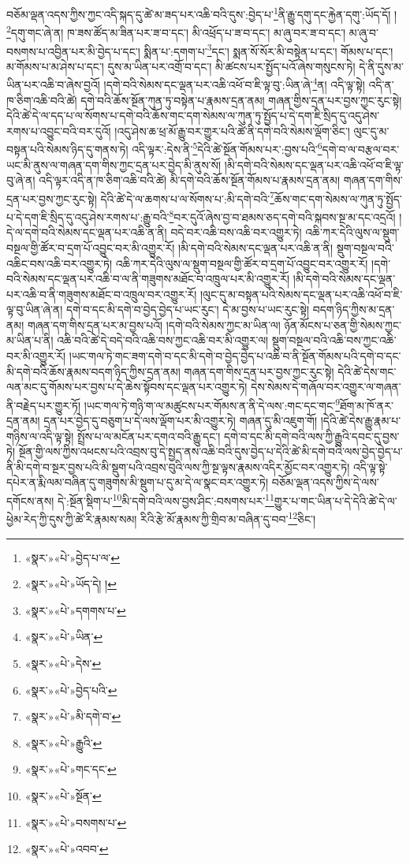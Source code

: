 བཅོམ་ལྡན་འདས་ཀྱིས་ཀྱང་འདི་སྐད་དུ་ཚེ་མ་ཟད་པར་འཆི་བའི་དུས་:བྱེད་པ་\footnote{«སྣར་»«པེ་»བྱེད་པ་ལ་}ནི་རྒྱུ་དགུ་དང་རྐྱེན་དགུ་:ཡོད་དོ། །
\footnote{«སྣར་»«པེ་»ཡོད་དེ། །}དགུ་གང་ཞེ་ན། ཁ་ཟས་ཚོད་མ་ཟིན་པར་ཟ་བ་དང་། མི་འཕྲོད་པ་ཟ་བ་དང་། མ་ཞུ་བར་ཟ་བ་དང་། མ་ཞུ་བ་བསགས་པ་འབྱིན་པར་མི་བྱེད་པ་དང་། སྨིན་པ་:དགག་པ་\footnote{«སྣར་»«པེ་»དགགས་པ་}དང་། སྨན་སོ་སོར་མི་བསྟེན་པ་དང་། གོམས་པ་དང་། མ་གོམས་པ་མ་ཤེས་པ་དང་། དུས་མ་ཡིན་པར་འགྲོ་བ་དང་། མི་ཚངས་པར་སྤྱོད་པའོ་ཞེས་གསུངས་ཏེ། དེ་ནི་དུས་མ་ཡིན་པར་འཆི་བ་ཞེས་བྱའོ། །དགེ་བའི་སེམས་དང་ལྡན་པར་འཆི་འཕོ་བ་ཇི་ལྟ་བུ་:ཡིན་ཞེ་\footnote{«སྣར་»«པེ་»ཡིན་}ན། འདི་ལྟ་སྟེ། འདི་ན་ཁ་ཅིག་འཆི་བའི་ཚེ། དགེ་བའི་ཆོས་སྔོན་ཀུན་ཏུ་བསྟེན་པ་རྣམས་དྲན་ནམ། གཞན་གྱིས་དྲན་པར་བྱས་ཀྱང་རུང་སྟེ། དེའི་ཚེ་དེ་ལ་དད་པ་ལ་སོགས་པ་དགེ་བའི་ཆོས་གང་དག་སེམས་ལ་ཀུན་ཏུ་སྤྱོད་པ་དེ་དག་ཇི་སྲིད་དུ་འདུ་ཤེས་རགས་པ་འབྱུང་བའི་བར་དུའོ། །འདུ་ཤེས་ཆ་ཕྲ་མོ་རྒྱུ་བར་གྱུར་པའི་ཚེ་ནི་དགེ་བའི་སེམས་ལྡོག་ཅིང་། ལུང་དུ་མ་བསྟན་པའི་སེམས་ཉིད་དུ་གནས་ཏེ། འདི་ལྟར་:དེས་ནི་\footnote{«སྣར་»«པེ་»དེས་}དེའི་ཚེ་སྔོན་གོམས་པར་:བྱས་པའི་\footnote{«སྣར་»«པེ་»བྱེད་པའི་}དགེ་བ་ལ་བརྩལ་བར་ཡང་མི་ནུས་ལ་གཞན་དག་གིས་ཀྱང་དྲན་པར་བྱེད་མི་ནུས་སོ། །མི་དགེ་བའི་སེམས་དང་ལྡན་པར་འཆི་འཕོ་བ་ཇི་ལྟ་བུ་ཞེ་ན། འདི་ལྟར་འདི་ན་ཁ་ཅིག་འཆི་བའི་ཚེ། མི་དགེ་བའི་ཆོས་སྔོན་གོམས་པ་རྣམས་དྲན་ནམ། གཞན་དག་གིས་དྲན་པར་བྱས་ཀྱང་རུང་སྟེ། དེའི་ཚེ་དེ་ལ་ཆགས་པ་ལ་སོགས་པ་:མི་དགེ་བའི་\footnote{«སྣར་»«པེ་»མི་དགེ་བ་}ཆོས་གང་དག་སེམས་ལ་ཀུན་ཏུ་སྤྱོད་པ་དེ་དག་ཇི་སྲིད་དུ་འདུ་ཤེས་རགས་པ་:རྒྱུ་བའི་\footnote{«སྣར་»«པེ་»རྒྱུའི་}བར་དུའོ་ཞེས་བྱ་བ་ཐམས་ཅད་དགེ་བའི་སྐབས་སྔ་མ་དང་འདྲའོ། །དེ་ལ་དགེ་བའི་སེམས་དང་ལྡན་པར་འཆི་ན་ནི། བདེ་བར་འཆི་བས་འཆི་བར་འགྱུར་ཏེ། འཆི་ཀར་དེའི་ལུས་ལ་སྡུག་བསྔལ་གྱི་ཚོར་བ་དྲག་པོ་འབྱུང་བར་མི་འགྱུར་རོ། །མི་དགེ་བའི་སེམས་དང་ལྡན་པར་འཆི་ན་ནི། སྡུག་བསྔལ་བའི་འཆིང་བས་འཆི་བར་འགྱུར་ཏེ། འཆི་ཀར་དེའི་ལུས་ལ་སྡུག་བསྔལ་གྱི་ཚོར་བ་དྲག་པོ་འབྱུང་བར་འགྱུར་རོ། །དགེ་བའི་སེམས་དང་ལྡན་པར་འཆི་བ་ལ་ནི་གཟུགས་མཐོང་བ་འཁྲུལ་པར་མི་འགྱུར་རོ། །མི་དགེ་བའི་སེམས་དང་ལྡན་པར་འཆི་བ་ནི་གཟུགས་མཐོང་བ་འཁྲུལ་བར་འགྱུར་རོ། །ལུང་དུ་མ་བསྟན་པའི་སེམས་དང་ལྡན་པར་འཆི་འཕོ་བ་ཇི་ལྟ་བུ་ཡིན་ཞེ་ན། དགེ་བ་དང་མི་དགེ་བ་བྱེད་བྱེད་པ་ཡང་རུང་། དེ་མ་བྱས་པ་ཡང་རུང་སྟེ། བདག་ཉིད་ཀྱིས་མ་དྲན་ནམ། གཞན་དག་གིས་དྲན་པར་མ་བྱས་པའོ། །དགེ་བའི་སེམས་ཀྱང་མ་ཡིན་ལ། ཉོན་མོངས་པ་ཅན་གྱི་སེམས་ཀྱང་མ་ཡིན་པ་ནི། འཆི་བའི་ཚེ་དེ་བདེ་བའི་འཆི་བས་ཀྱང་འཆི་བར་མི་འགྱུར་ལ། སྡུག་བསྔལ་བའི་འཆི་བས་ཀྱང་འཆི་བར་མི་འགྱུར་རོ། །ཡང་གལ་ཏེ་གང་ཟག་དགེ་བ་དང་མི་དགེ་བ་བྱེད་བྱེད་པ་འཆི་བ་ནི་སྔོན་གོམས་པའི་དགེ་བ་དང་མི་དགེ་བའི་ཆོས་རྣམས་བདག་ཉིད་ཀྱིས་དྲན་ནམ། གཞན་དག་གིས་དྲན་པར་བྱས་ཀྱང་རུང་སྟེ། དེའི་ཚེ་དེས་གང་ལན་མང་དུ་གོམས་པར་བྱས་པ་དེ་ཆེས་སྟོབས་དང་ལྡན་པར་འགྱུར་ཏེ། དེས་སེམས་དེ་གཞོལ་བར་འགྱུར་ལ་གཞན་ནི་བརྗེད་པར་གྱུར་ཏོ། །ཡང་གལ་ཏེ་གཉི་ག་ལ་མཚུངས་པར་གོམས་ན་ནི་དེ་ལས་:གང་དང་གང་\footnote{«སྣར་»«པེ་»གང་དང་}ཐོག་མ་ཁོ་ནར་དྲན་ནམ། དྲན་པར་བྱེད་དུ་བཅུག་པ་དེ་ལས་ལྡོག་པར་མི་འགྱུར་ཏེ། གཞན་དུ་མི་འཇུག་གོ། །དེའི་ཚེ་དེས་རྒྱུ་རྣམ་པ་གཉིས་ལ་འདི་ལྟ་སྟེ། སྤྲོས་པ་ལ་མངོན་པར་དགའ་བའི་རྒྱུ་དང་། དགེ་བ་དང་མི་དགེ་བའི་ལས་ཀྱི་རྒྱུའི་དབང་དུ་བྱས་ཏེ། སྔོན་གྱི་ལས་ཀྱིས་འཕངས་པའི་འབྲས་བུ་དེ་སྤྱད་ནས་འཆི་བའི་དུས་བྱེད་པ་དེའི་ཚེ་མི་དགེ་བའི་ལས་བྱེད་བྱེད་པ་ནི་མི་དགེ་བ་སྔར་བྱས་པའི་མི་སྡུག་པའི་འབྲས་བུའི་ལས་ཀྱི་སྔ་ལྟས་རྣམས་འདིར་མྱོང་བར་འགྱུར་ཏེ། འདི་ལྟ་སྟེ་དཔེར་ན་རྨི་ལམ་བཞིན་དུ་གཟུགས་མི་སྡུག་པ་དུ་མ་དེ་ལ་སྣང་བར་འགྱུར་ཏེ། བཅོམ་ལྡན་འདས་ཀྱིས་དེ་ལས་དགོངས་ནས། དེ་:སྔོན་སྡིག་པ་\footnote{«སྣར་»«པེ་»སྔོན་}མི་དགེ་བའི་ལས་བྱས་ཤིང་:བསགས་པར་\footnote{«སྣར་»«པེ་»བསགས་པ་}གྱུར་པ་གང་ཡིན་པ་དེ་དེའི་ཚེ་དེ་ལ་ཕྱེམ་རེད་ཀྱི་དུས་ཀྱི་ཚེ་རི་རྣམས་སམ། རིའི་རྩེ་མོ་རྣམས་ཀྱི་གྲིབ་མ་བཞིན་དུ་བབ་\footnote{«སྣར་»«པེ་»འབབ་}ཅིང་། 